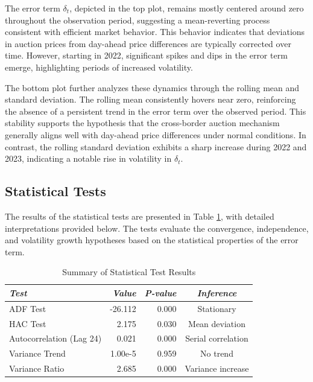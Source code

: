 \documentclass[12pt]{article}
\begin{document}
The error term $\delta_t$, depicted in the top plot, remains mostly centered around zero throughout the observation period, suggesting a mean-reverting process consistent with efficient market behavior. This behavior indicates that deviations in auction prices from day-ahead price differences are typically corrected over time. However, starting in 2022, significant spikes and dips in the error term emerge, highlighting periods of increased volatility.

The bottom plot further analyzes these dynamics through the rolling mean and standard deviation. The rolling mean consistently hovers near zero, reinforcing the absence of a persistent trend in the error term over the observed period. This stability supports the hypothesis that the cross-border auction mechanism generally aligns well with day-ahead price differences under normal conditions. In contrast, the rolling standard deviation exhibits a sharp increase during 2022 and 2023, indicating a notable rise in volatility in $\delta_t$.



\subsection{Statistical Tests}

The results of the statistical tests are presented in Table \ref{tab:test_results}, with detailed interpretations provided below. The tests evaluate the convergence, independence, and volatility growth hypotheses based on the statistical properties of the error term.

\begin{table}[ht]
   \footnotesize
   \centering
   \caption{Summary of Statistical Test Results}
   \label{tab:test_results}
   \begin{tabular}{lrrc}
       \hline
       \textit{Test} & \textit{Value} & \textit{P-value} & \textit{Inference} \\
       \hline
       ADF Test & -26.112 & 0.000 & Stationary \\
       HAC Test & 2.175 & 0.030 & Mean deviation \\
       Autocorrelation (Lag 24) & 0.021 & 0.000 & Serial correlation \\
       Variance Trend & 1.00e-5 & 0.959 & No trend \\
       Variance Ratio & 2.685 & 0.000 & Variance increase \\
       \hline
   \end{tabular}
\end{table}
\end{document}
